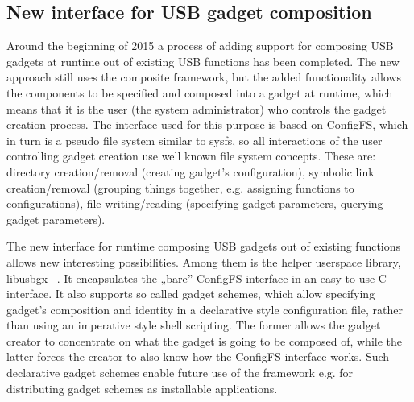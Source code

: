 \documentclass[10pt, a5paper]{article}
\begin{document}
\subsection*{New interface for USB gadget composition}

Around the beginning of 2015 a process of adding support for \linebreak composing USB gadgets at runtime out of existing USB functions has been completed. The new approach still uses the composite framework, but the added functionality allows the components to be specified and composed into a gadget at runtime, which means that it is the user (the system administrator) who controls the gadget creation process. The interface used for this purpose is based on ConfigFS, which in turn is a pseudo file system similar to sysfs, so all interactions of the user controlling gadget creation use well known file system concepts. These are: directory creation/removal (creating gadget's configuration), symbolic link creation/removal (grouping things together, e.g. assigning functions to configurations), file writing/reading (specifying gadget \linebreak parameters, querying gadget parameters).

The new interface for runtime composing USB gadgets out of existing functions allows new interesting possibilities. Among them is the helper userspace library, libusbgx ~\cite{Pietrasiewicz9}. It encapsulates the „bare” ConfigFS interface in an easy-to-use C interface. It also supports so called gadget schemes, which allow specifying gadget's composition and identity in a declarative style configuration file, rather than using an imperative style shell scripting. The former allows the gadget creator to concentrate on what the gadget is going to be composed of, while the latter forces the creator to also know how the ConfigFS interface works. Such declarative gadget schemes enable future use of the framework e.g. for distributing gadget schemes as installable applications.
\end{document}
